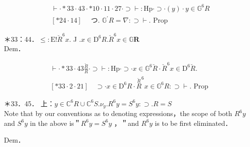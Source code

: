 \documentclass[10pt]{article}
\begin{document}
$$
\begin{aligned}
& \vdash \cdot * 33 \cdot 43 \cdot * 10 \cdot 11 \cdot 27 \cdot \supset \vdash: \mathrm{Hp} \cdot \supset \cdot(y) \cdot y \in \mathbb{G}^{6} R \\
& {[* 24 \cdot 14] \quad \text { つ. } \mathbb{G}^{\prime} R=\nabla: \supset \vdash . \text { Prop }}
\end{aligned}
$$

＊33：44．$\leqslant: \mathrm{E}!\breve{R}^{6} x$. J $. x \in \mathrm{D}^{6} R . \breve{R}^{6} x \in \mathbb{G} \boldsymbol{R}$\\
Dem．

$$
\begin{aligned}
& \vdash \cdot * 33 \cdot 43 \frac{\breve{R}}{R} \cdot \supset \vdash: \mathrm{Hp} \cdot \supset \cdot x \in \mathbb{G}^{6} \breve{R} \cdot \breve{R}^{6} x \in \mathrm{D}^{6} \breve{R} . \\
& {[* 33 \cdot 2 \cdot 21] \quad \supset \cdot x \in \mathrm{D}^{6} R \cdot \stackrel{\breve{R}}{R}^{6} x \in \mathbb{G}^{6} R: \supset \vdash . \text { Prop }}
\end{aligned}
$$

＊33．45． 上：$y \in \mathbb{C}^{6} R \cup \mathbb{C}^{6} S . \nu_{y} . R^{6} y=S^{6} y: \supset . R=S$\\
Note that by our conventions as to denoting expressions，the scope of both $R^{6} y$ and $S^{6} y$ in the above is＂$R^{6} y=S^{6} y$ ，＂and $R^{6} y$ is to be first eliminated．

Dem．
\end{document}
